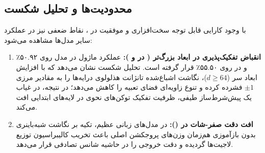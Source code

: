 \subsection{محدودیت‌ها و تحلیل شکست}
با وجود کارایی قابل توجه سخت‌افزاری و موفقیت در ، نقاط ضعفی نیز در عملکرد سایر مدل‌ها مشاهده می‌شود:
\begin{enumerate}
    \item \textbf{انقباض تفکیک‌پذیری در ابعاد بزرگ‌تر ( در  و ):} عملکرد ماژول در مدل  روی ۵۰.۹۲٪ و در  روی ۵۵.۵۰٪ قرار گرفته است. تحلیل شکست نشان می‌دهد که با افزایش ابعاد سر ($d \ge 64$)، نگاشت اشباع‌شده تانژانت هذلولوی درایه‌ها را به مقادیر مرزی $\pm 1$ فشرده کرده و تنوع زاویه‌ای فضای تعبیه را کاهش می‌دهد؛ در نتیجه، در غیاب یک پیش‌شرط‌ساز طیفی، ظرفیت تفکیک توکن‌های نحوی در لایه‌های ابتدایی افت می‌کند.
    \item \textbf{افت دقت صفر-شات در  ():} در مدل‌های زبانی عظیم، تکیه بر نگاشت شبه‌باینری بدون بازآموزی هم‌زمان وزن‌های پروجکشن اصلی باعث تخریب کالیبراسیون توزیع لاجیت‌ها گردیده و دقت خروجی را در حاشیه شانس تصادفی قرار می‌دهد.
\end{enumerate}
